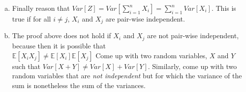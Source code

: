 \documentclass[]{article}
\newif\ifsolutions
\renewcommand{\answer}[1]{{\color{mydarkblue}\textbf{Solution:}#1}}
\def \exx {\mathbb{E}}
\begin{document}
\begin{qunlist}
\begin{enumerate}[a)]
\ifsolutions{ \answer {
Since $Var[Z] = \exx[Z^2] - \exx[Z]^2$ We subtract our answer from c from our answer from b. \\ $Var[Z] = \sum\nolimits_{i=1}^n \exx[X_i^2] + \sum_{i=1}^n \sum_{j \neq i} \exx[X_iX_j] - \sum\nolimits_{i=1}^n \exx[X_i]^2 + \sum_{i=1}^n \sum\limits_{j \neq i} \exx[X_i] \exx[X_j] $ We group our summations together $\\ Var[Z] =  \sum\nolimits_{i=1}^n (\exx[X_i^2] - \exx[X_i]^2) + \sum\limits_{j \neq i} ( \exx[X_iX_j] - \exx[X_i]\exx[X_j])$ Since $X_i$ and $X_j$ are pair-wise independent, we use our lemma that $\exx[X_iX_j] = \exx[X_i]\exx[X_j]$ \\ $Var[X] = \sum\nolimits_{i=1}^n (\exx[X_i^2] - \exx[X_i]^2)$ 

}}
\fi

\qpart
\item Finally reason that $Var[Z] = Var[\sum\nolimits_{i=1}^n X_i] =    \sum\nolimits_{i=1}^n Var[X_i]$. This is true if for all $i \neq j$, $X_i$ and $X_j$ are pair-wise independent.
\ifsolutions{ \answer {
We look at the previous expression and we realize that $Var[X_i] = \exx[X_i^2] - \exx[X_i]^2$. So, $\\Var[X] = \sum\nolimits_{i=1}^n (\exx[X_i^2] - \exx[X_i]^2) = \sum\nolimits_{i=1}^n Var[X_i]$

}}
\fi

\qpart
\item The proof above does not hold if $X_i$ and $X_j$ are not pair-wise
  independent, because then it is possible that \\ $\exx[X_iX_j] \neq
  \exx[X_i]\exx[X_j]$ Come up with two random variables, $X$ and $Y$
  such that $Var[X+Y] \neq Var[X] + Var[Y]$. Similarly, come up with
  two random variables that are {\em not independent} but for which
  the variance of the sum is nonetheless the sum of the variances.


\end{enumerate}
\end{qunlist}
\end{document}
